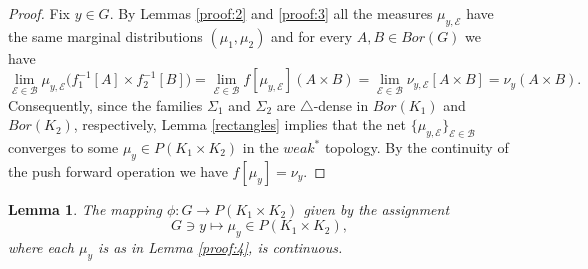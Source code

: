 \documentclass[12pt,fleqn]{amsart}
\numberwithin{equation}{section}
\newtheorem{lemma}[thm]{Lemma}
\theoremstyle{definition}
\def\B{\mathcal B}
\newcommand{\cE}{\mathcal E}
\begin{document}
\begin{proof}
Fix $y\in G$. By Lemmas \ref{proof:2} and \ref{proof:3} all the measures $\mu_{y,\cE}$ have the same marginal distributions $(\mu_1,\mu_2)$ and for every $A,B\in Bor(G)$ we have
\[\lim_{\cE\in\mathcal{B}}\mu_{y,\cE}\big(f_1^{-1}[A]\times f_2^{-1}[B]\big)=\lim_{\cE\in\mathcal{B}}f[\mu_{y,\cE}](A\times B)=\lim_{\cE\in\mathcal{B}}\nu_{y,\cE}[A\times B]=\nu_y(A\times B).\]
Consequently, since the families $\Sigma_1$ and $\Sigma_2$ are $\bigtriangleup$-dense in $Bor(K_1)$ and $Bor(K_2)$, respectively, Lemma \ref{rectangles} implies that the net $\{\mu_{y,\cE} \}_{\cE \in \B}$ converges to some $\mu_y\in P(K_1\times K_2)$ in the $weak^\ast$ topology. By the continuity of the push forward operation we have $f[\mu_y]=\nu_y$.
\end{proof} 

\begin{lemma}\label{proof:5}
The mapping $\phi\colon G\to P(K_1\times K_2)$ given by the assignment
\[ G\ni y\mapsto \mu_y\in P(K_1\times K_2),\]
where each $\mu_y$ is as in Lemma \ref{proof:4}, is continuous.
\end{lemma}
\end{document}
